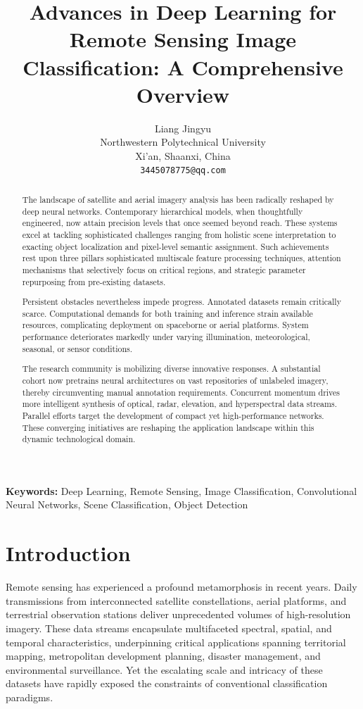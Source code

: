 \documentclass[12pt,a4paper]{article}
\title{\fontsize{14}{17}\selectfont\textbf{Advances in Deep Learning for Remote Sensing Image Classification: A Comprehensive Overview}}
\author{Liang Jingyu\\
        Northwestern Polytechnical University\\
        Xi'an, Shaanxi, China\\
        \texttt{3445078775@qq.com}}
\date{}
\begin{document}
\maketitle

\begin{abstract}
The landscape of satellite and aerial imagery analysis has been radically reshaped by deep neural networks. Contemporary hierarchical models, when thoughtfully engineered, now attain precision levels that once seemed beyond reach. These systems excel at tackling sophisticated challenges ranging from holistic scene interpretation to exacting object localization and pixel-level semantic assignment. Such achievements rest upon three pillars sophisticated multiscale feature processing techniques, attention mechanisms that selectively focus on critical regions, and strategic parameter repurposing from pre-existing datasets.

Persistent obstacles nevertheless impede progress. Annotated datasets remain critically scarce. Computational demands for both training and inference strain available resources, complicating deployment on spaceborne or aerial platforms. System performance deteriorates markedly under varying illumination, meteorological, seasonal, or sensor conditions.

The research community is mobilizing diverse innovative responses. A substantial cohort now pretrains neural architectures on vast repositories of unlabeled imagery, thereby circumventing manual annotation requirements. Concurrent momentum drives more intelligent synthesis of optical, radar, elevation, and hyperspectral data streams. Parallel efforts target the development of compact yet high-performance networks. These converging initiatives are reshaping the application landscape within this dynamic technological domain.
\end{abstract}

\textbf{Keywords:} Deep Learning, Remote Sensing, Image Classification, Convolutional Neural Networks, Scene Classification, Object Detection

\section{Introduction}
\label{sec:introduction}
Remote sensing has experienced a profound metamorphosis in recent years. Daily transmissions from interconnected satellite constellations, aerial platforms, and terrestrial observation stations deliver unprecedented volumes of high-resolution imagery. These data streams encapsulate multifaceted spectral, spatial, and temporal characteristics, underpinning critical applications spanning territorial mapping, metropolitan development planning, disaster management, and environmental surveillance. Yet the escalating scale and intricacy of these datasets have rapidly exposed the constraints of conventional classification paradigms.
\end{document}
